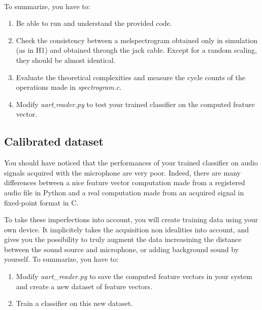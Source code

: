 \\
%
\noindent To summarize, you have to:
\begin{enumerate}
    \item Be able to run and understand the provided code.
    \item Check the consistency between a melspectrogram obtained only in simulation (as in H1) and obtained through the jack cable. Except for a random scaling, they should be almost identical.
    \item Evaluate the theoretical complexities and measure the cycle counts of the operations made in \emph{spectrogram.c}.
    \item Modify \emph{uart$\_$reader.py} to test your trained classifier on the computed feature vector.
\end{enumerate}
%
\subsection{Calibrated dataset}
%
You should have noticed that the performances of your trained classifier on audio signals acquired with the microphone are very poor. Indeed, there are many differences between a nice feature vector computation made from a registered audio file in Python and a real computation made from an acquired signal in fixed-point format in C.

To take these imperfections into account, you will create training data using your own device. It implicitely takes the acquisition non idealities into account, and gives you the possibility to truly augment the data increasining the distance between the sound source and microphone, or adding background sound by yourself.
%
\noindent To summarize, you have to:
\begin{enumerate}
    \item Modify \emph{uart\_reader.py} to save the computed feature vectors in your system and create a new dataset of feature vectors.
    \item Train a classifier on this new dataset.
\end{enumerate}
